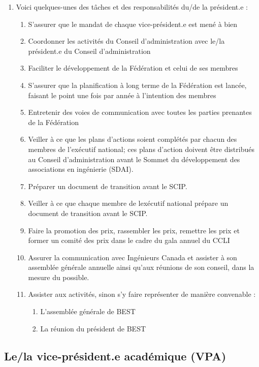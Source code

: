 \begin{enumerate}
 \item
  Voici quelques-unes des tâches et des responsabilités du/de la président.e :
  \begin{enumerate}
   \item
    S'assurer que le mandat de chaque vice-président.e est mené à bien
   \item
    Coordonner les activités du Conseil d'administration avec le/la président.e du Conseil d'administration
   \item
    Faciliter le développement de la Fédération et celui de ses membres
   \item
    S'assurer que la planification à long terme de la Fédération est lancée, faisant le point une fois par année à l'intention des membres
   \item
    Entretenir des voies de communication avec toutes les parties prenantes de la Fédération
   \item
    Veiller à ce que les plans d'actions soient complétés par chacun des membres de l'exécutif national; ces plans d'action doivent être distribués au Conseil d'administration avant le Sommet du développement des associations en ingénierie (SDAI).
   \item
    Préparer un document de transition avant le SCIP.
   \item
    Veiller à ce que chaque membre de l\textquotesingle exécutif national prépare un document de transition avant le SCIP.
   \item
    Faire la promotion des prix, rassembler les prix, remettre les prix et former un comité des prix dans le cadre du gala annuel du CCLI
   \item
    Assurer la communication avec Ingénieurs Canada et assister à son assemblée générale annuelle ainsi qu'aux réunions de son conseil, dans la mesure du possible.
   \item
    Assister aux activités, sinon s'y faire représenter de manière convenable :

    \begin{enumerate}
     \item
      L'assemblée générale de BEST
     \item
      La réunion du président de BEST
    \end{enumerate}
  \end{enumerate}
\end{enumerate}

\subsection{Le/la vice-président.e académique (VPA)}
\label{le-la-vice-president-e-academique-vpa}


